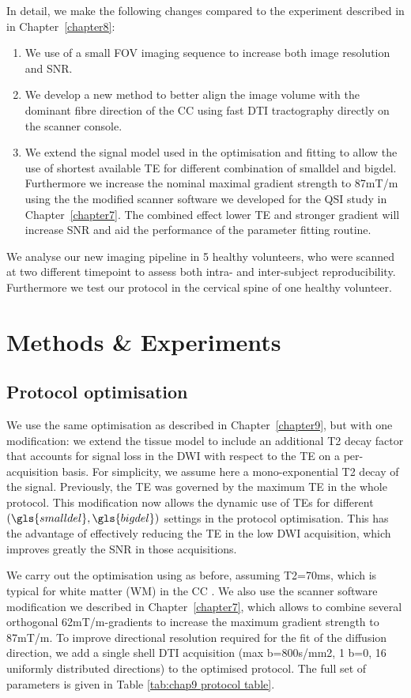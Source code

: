 In detail, we make the following changes compared to the \SFasym{} experiment described in in Chapter~\ref{chapter8}:
\begin{enumerate}
\item We use of a small \gls{FOV} imaging sequence to increase both image resolution and SNR.
\item We develop a new method to better align the image volume with the dominant fibre direction of the CC using fast DTI tractography directly on the scanner console.
\item We extend the signal model used in the optimisation and fitting to allow the use of shortest available \gls{TE} for different combination of \gls{smalldel} and \gls{bigdel}. Furthermore we increase the nominal maximal gradient strength to 87mT/m using the the modified scanner software we developed for the QSI study in Chapter~\ref{chapter7}. The combined effect lower \gls{TE} and stronger gradient will increase SNR and aid the performance of the parameter fitting routine.
\end{enumerate}
We analyse our new imaging pipeline in 5 healthy volunteers, who were scanned at two different timepoint to assess both intra- and inter-subject reproducibility. Furthermore we test our protocol in the cervical spine of one healthy volunteer. 


\section{Methods \& Experiments}
\subsection*{Protocol optimisation}
We use the same \SFasym{} optimisation as described in Chapter~\ref{chapter9}, but with one modification: we extend the tissue model to include an additional T2 decay factor that accounts for signal loss in the DWI with respect to the \gls{TE} on a per-acquisition basis. For simplicity, we assume here a mono-exponential T2 decay of the signal. Previously, the \gls{TE} was governed by the maximum TE in the whole protocol. This modification now allows the dynamic use of \glspl{TE} for different $(\gls{smalldel},\gls{bigdel})$ settings in the protocol optimisation. This has the advantage of effectively reducing the \gls{TE} in the low DWI acquisition, which improves greatly the SNR in those acquisitions.

We carry out the optimisation using as before, assuming T2=70ms, which is typical for white matter (WM) in the CC \cite{cite stanisz relaxation times paper}. We also use the scanner software modification we described in Chapter~\ref{chapter7}, which allows to combine several orthogonal 62mT/m-gradients to increase the maximum gradient strength to 87mT/m. To improve directional resolution required for the fit of the diffusion direction, we add a single shell DTI acquisition (max b=800s/mm2, 1 b=0, 16 uniformly distributed directions) to the optimised protocol. The full set of parameters is given in Table \ref{tab:chap9 protocol table}.


